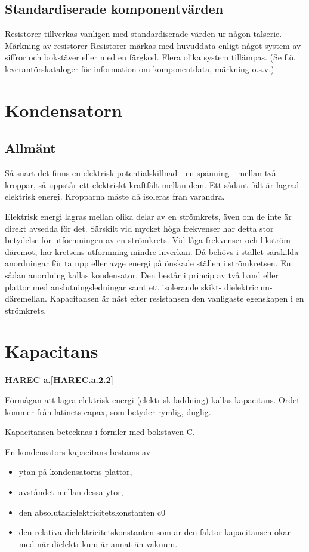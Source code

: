 \subsection{Standardiserade komponentvärden}

Resistorer tillverkas vanligen med standardiserade värden ur någon talserie.
Märkning av resistorer Resistorer märkas med huvuddata enligt
något system av siffror och bokstäver eller med en färgkod. Flera olika system tillämpas.
(Se f.ö. leverantörskataloger för information om komponentdata, märkning o.s.v.)

\section{Kondensatorn}

\subsection{Allmänt}

Så snart det finns en elektrisk potentialskillnad - en spänning - mellan två kroppar, så
uppstår ett elektriskt kraftfält mellan dem. Ett sådant fält är lagrad elektrisk energi.
Kropparna måste då isoleras från varandra.

Elektrisk energi lagras mellan olika delar av en strömkrets, även om de inte är direkt
avsedda för det. Särskilt vid mycket höga frekvenser har detta stor betydelse för
utformningen av en strömkrets. Vid låga frekvenser och likström däremot, har kretsens
utformning mindre inverkan. Då behövs i stället särskilda anordningar för ta upp eller
avge energi på önskade ställen i strömkretsen. En sådan anordning kallas kondensator.
Den består i princip av två band eller plattor
med anslutningsledningar samt ett isolerande skikt- dielektricum- däremellan.
Kapacitansen är näst efter resistansen den vanligaste egenskapen i en strömkrets.


\section{Kapacitans}
\textbf{HAREC a.\ref{HAREC.a.2.2}\label{myHAREC.a.2.2}}

Förmågan att lagra elektrisk energi (elektrisk laddning) kallas kapacitans.
Ordet kommer från latinets capax, som betyder rymlig, duglig.

Kapacitansen betecknas i formler med
bokstaven C.

En kondensators kapacitans bestäms av
\begin{itemize}
  \item ytan på kondensatorns plattor,
  \item avståndet mellan dessa ytor,
  \item den absolutadielektricitetskonstanten c0
  \item den relativa dielektricitetskonstanten som är den faktor kapacitansen ökar med när dielektrikum är annat än vakuum.
\end{itemize}

